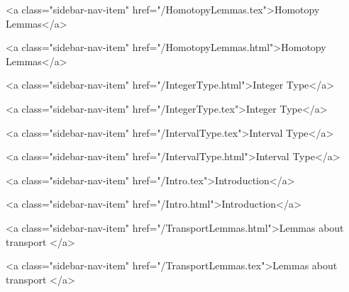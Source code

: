       
    
      
        
          <a class="sidebar-nav-item" href="/HomotopyLemmas.tex">Homotopy Lemmas</a>
        
      
    
      
        
          <a class="sidebar-nav-item" href="/HomotopyLemmas.html">Homotopy Lemmas</a>
        
      
    
      
        
          <a class="sidebar-nav-item" href="/IntegerType.html">Integer Type</a>
        
      
    
      
        
          <a class="sidebar-nav-item" href="/IntegerType.tex">Integer Type</a>
        
      
    
      
        
          <a class="sidebar-nav-item" href="/IntervalType.tex">Interval Type</a>
        
      
    
      
        
          <a class="sidebar-nav-item" href="/IntervalType.html">Interval Type</a>
        
      
    
      
        
          <a class="sidebar-nav-item" href="/Intro.tex">Introduction</a>
        
      
    
      
        
          <a class="sidebar-nav-item" href="/Intro.html">Introduction</a>
        
      
    
      
        
          <a class="sidebar-nav-item" href="/TransportLemmas.html">Lemmas about transport </a>
        
      
    
      
        
          <a class="sidebar-nav-item" href="/TransportLemmas.tex">Lemmas about transport </a>
        
      
    
      
        
      
    
      
        
